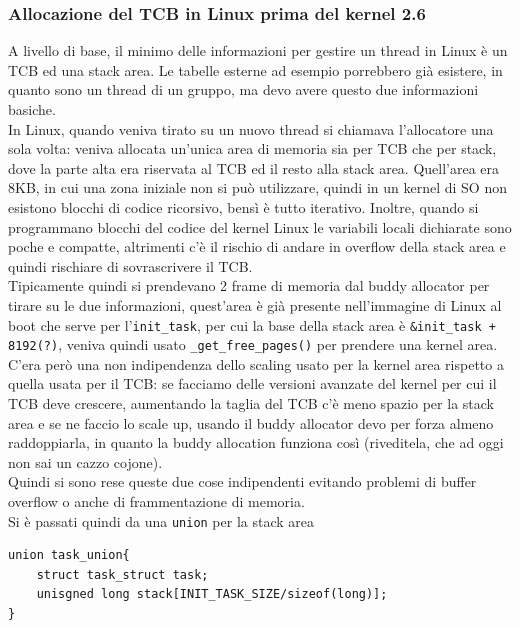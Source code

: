 \documentclass[12pt, oneside]{extbook}
\begin{document}
\subsubsection{Allocazione del TCB in Linux prima del kernel 2.6}
A livello di base, il minimo delle informazioni per gestire un thread in Linux è un TCB ed una stack area. Le tabelle esterne ad esempio porrebbero già esistere, in quanto sono un thread di un gruppo, ma devo avere questo due informazioni basiche.\\In Linux, quando veniva tirato su un nuovo thread si chiamava l'allocatore una sola volta: veniva allocata un'unica area di memoria sia per TCB che per stack, dove la parte alta era riservata al TCB ed il resto alla stack area. Quell'area era 8KB, in cui una zona iniziale non si può utilizzare, quindi in un kernel di SO non esistono blocchi di codice ricorsivo, bensì è tutto iterativo. Inoltre, quando si programmano blocchi del codice del kernel Linux le variabili locali dichiarate sono poche e compatte, altrimenti c'è il rischio di andare in overflow della stack area e quindi rischiare di sovrascrivere il TCB.\\Tipicamente quindi si prendevano 2 frame di memoria dal buddy allocator per tirare su le due informazioni, quest'area è già presente nell'immagine di Linux al boot che serve per l'\texttt{init\_task}, per cui la base della stack area è \texttt{\&init\_task + 8192(?)}, veniva quindi usato \texttt{\_get\_free\_pages()} per prendere una kernel area.\\ C'era però una non indipendenza dello scaling usato per la kernel area rispetto a quella usata per il TCB: se facciamo delle versioni avanzate del kernel per cui il TCB deve crescere, aumentando la taglia del TCB c'è meno spazio per la stack area e se ne faccio lo scale up, usando il buddy allocator devo per forza almeno raddoppiarla, in quanto la buddy allocation funziona così (riveditela, che ad oggi non sai un cazzo cojone).\\Quindi si sono rese queste due cose indipendenti evitando problemi di buffer overflow o anche di frammentazione di memoria.\\ Si è passati quindi da una \texttt{union} per la stack area
\begin{lstlisting}
union task_union{
	struct task_struct task;
	unisgned long stack[INIT_TASK_SIZE/sizeof(long)];
}
\end{lstlisting}
\end{document}
